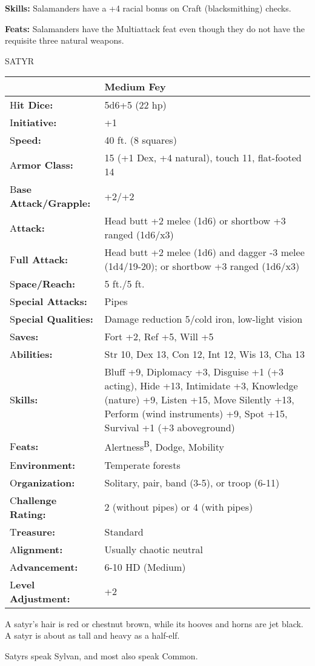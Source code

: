 \documentclass{article}
\begin{document}
\textbf{Skills:} Salamanders have a +4 racial bonus on Craft (blacksmithing) checks.

\textbf{Feats:} Salamanders have the Multiattack feat even though they do not have 
the requisite three natural weapons.

\vspace{12pt}
{\LARGE{}SATYR}

\begin{tabular}{|>{\raggedright}p{89pt}|>{\raggedright}p{236pt}|}
\hline
  & Medium Fey\tabularnewline
\hline
H\textbf{it Dice:} & 5d6+5 (22 hp)\tabularnewline
\hline
I\textbf{nitiative:} & +1\tabularnewline
\hline
S\textbf{peed:} & 40 ft. (8 squares)\tabularnewline
\hline
A\textbf{rmor Class:} & 15 (+1 Dex, +4 natural), touch 11, flat-footed 14\tabularnewline
\hline
B\textbf{ase Attack/Grapple:} & +2/+2\tabularnewline
\hline
A\textbf{ttack:} & Head butt +2 melee (1d6) or shortbow +3 ranged (1d6/x3)\tabularnewline
\hline
F\textbf{ull Attack:} & Head butt +2 melee (1d6) and dagger -3 melee (1d4/19-20); 
or shortbow +3 ranged (1d6/x3)\tabularnewline
\hline
S\textbf{pace/Reach:} & 5 ft./5 ft.\tabularnewline
\hline
S\textbf{pecial Attacks:} & Pipes\tabularnewline
\hline
S\textbf{pecial Qualities:} & Damage reduction 5/cold iron, low-light vision\tabularnewline
\hline
S\textbf{aves:} & Fort +2, Ref +5, Will +5\tabularnewline
\hline
A\textbf{bilities:} & Str 10, Dex 13, Con 12, Int 12, Wis 13, Cha 13\tabularnewline
\hline
S\textbf{kills:} & Bluff +9, Diplomacy +3, Disguise +1 (+3 acting), Hide +13, Intimidate 
+3, Knowledge (nature) +9, Listen +15, Move Silently +13, Perform (wind instruments) 
+9, Spot +15, Survival +1 (+3 aboveground)\tabularnewline
\hline
F\textbf{eats:} & Alertness\textsuperscript{B}, Dodge, Mobility\tabularnewline
\hline
E\textbf{nvironment:} & Temperate forests\tabularnewline
\hline
O\textbf{rganization:} & Solitary, pair, band (3-5), or troop (6-11)\tabularnewline
\hline
C\textbf{hallenge Rating:} & 2 (without pipes) or 4 (with pipes)\tabularnewline
\hline
T\textbf{reasure:} & Standard\tabularnewline
\hline
A\textbf{lignment:} & Usually chaotic neutral\tabularnewline
\hline
A\textbf{dvancement:} & 6-10 HD (Medium)\tabularnewline
\hline
L\textbf{evel Adjustment:} & +2\tabularnewline
\hline
\end{tabular}

A satyr's hair is red or chestnut brown, while its hooves and horns are jet black. 
A satyr is about as tall and heavy as a half-elf.

Satyrs speak Sylvan, and most also speak Common.
\end{document}
